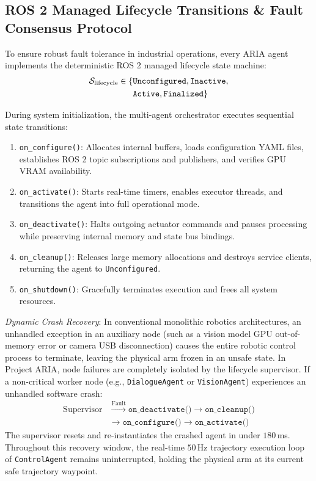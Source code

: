 \documentclass[journal]{IEEEtran}
\begin{document}
\subsection{ROS 2 Managed Lifecycle Transitions \& Fault Consensus Protocol}
To ensure robust fault tolerance in industrial operations, every ARIA agent implements the deterministic ROS 2 managed lifecycle state machine:
\begin{equation}
\begin{split}
\mathcal{S}_{\text{lifecycle}} \in \{ &\text{\texttt{Unconfigured}}, \text{\texttt{Inactive}}, \\
&\text{\texttt{Active}}, \text{\texttt{Finalized}} \}
\end{split}
\end{equation}

During system initialization, the multi-agent orchestrator executes sequential state transitions:
\begin{enumerate}
    \item \texttt{on\_configure()}: Allocates internal buffers, loads configuration YAML files, establishes ROS 2 topic subscriptions and publishers, and verifies GPU VRAM availability.
    \item \texttt{on\_activate()}: Starts real-time timers, enables executor threads, and transitions the agent into full operational mode.
    \item \texttt{on\_deactivate()}: Halts outgoing actuator commands and pauses processing while preserving internal memory and state bus bindings.
    \item \texttt{on\_cleanup()}: Releases large memory allocations and destroys service clients, returning the agent to \texttt{Unconfigured}.
    \item \texttt{on\_shutdown()}: Gracefully terminates execution and frees all system resources.
\end{enumerate}

\textit{Dynamic Crash Recovery}: In conventional monolithic robotics architectures, an unhandled exception in an auxiliary node (such as a vision model GPU out-of-memory error or camera USB disconnection) causes the entire robotic control process to terminate, leaving the physical arm frozen in an unsafe state. In Project ARIA, node failures are completely isolated by the lifecycle supervisor. If a non-critical worker node (e.g., \texttt{DialogueAgent} or \texttt{VisionAgent}) experiences an unhandled software crash:
\begin{equation}
\begin{split}
\text{Supervisor} &\xrightarrow{\text{Fault}} \texttt{on\_deactivate()} \to \texttt{on\_cleanup()} \\
&\to \texttt{on\_configure()} \to \texttt{on\_activate()}
\end{split}
\end{equation}
The supervisor resets and re-instantiates the crashed agent in under $180$\,ms. Throughout this recovery window, the real-time $50$\,Hz trajectory execution loop of \texttt{ControlAgent} remains uninterrupted, holding the physical arm at its current safe trajectory waypoint.
\end{document}

